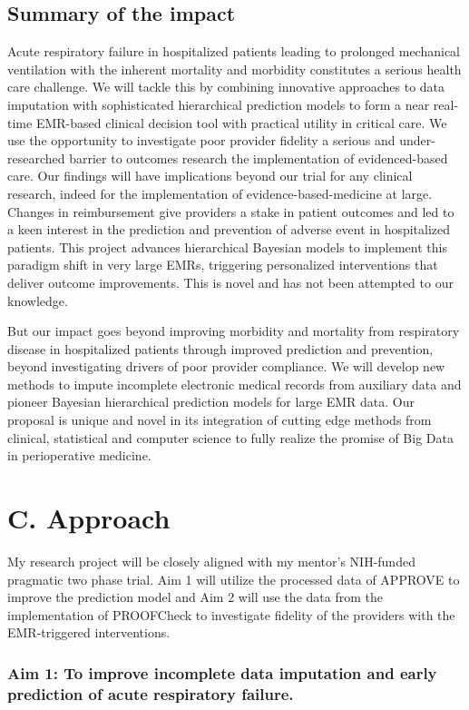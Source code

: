 \documentclass[11pt,notitlepage]{article}
\begin{document}
\subsection*{Summary of the impact}
Acute respiratory failure in hospitalized patients leading to prolonged mechanical ventilation with the inherent mortality and morbidity constitutes a serious health care challenge. We will tackle this by combining innovative approaches to data imputation with sophisticated hierarchical prediction models to form a near real-time EMR-based clinical decision tool with practical utility in critical care. We use the opportunity to investigate poor provider fidelity a serious and under-researched barrier to outcomes research the implementation of evidenced-based care. Our findings will have implications beyond our trial for any clinical research, indeed for the implementation of evidence-based-medicine at large. Changes in reimbursement give providers a stake in patient outcomes and led to a keen interest in the prediction and prevention of adverse event in hospitalized patients. This project advances hierarchical Bayesian models to implement this paradigm shift in very large EMRs, triggering personalized interventions that deliver outcome improvements. This is novel and has not been attempted to our knowledge.

But our impact goes beyond improving morbidity and mortality from respiratory disease in hospitalized patients through improved prediction and prevention, beyond investigating drivers of poor provider compliance. We will develop new methods to impute incomplete electronic medical records from auxiliary data and pioneer Bayesian hierarchical prediction models for large EMR data. Our proposal is unique and novel in its integration of cutting edge methods from clinical, statistical and computer science to fully realize the promise of Big Data in perioperative medicine.


\section*{C. Approach}
My research project will be closely aligned with my mentor's NIH-funded pragmatic two phase trial. Aim 1 will utilize the processed data of APPROVE to improve the prediction model and Aim 2 will use the data from the implementation of PROOFCheck to investigate fidelity of the providers with the EMR-triggered interventions.

\subsubsection*{Aim 1: To improve incomplete data imputation and early prediction of acute respiratory failure.}
\end{document}
